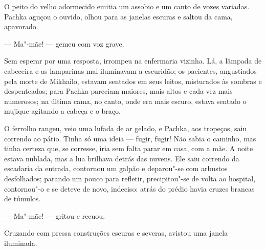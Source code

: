 O peito do velho adormecido emitia um assobio e um canto de vozes
variadas. Pachka aguçou o ouvido, olhou para as janelas escuras e saltou
da cama, apavorado.

--- Ma"-mãe! --- gemeu com voz grave.

Sem esperar por uma resposta, irrompeu na enfermaria vizinha. Lá, a
lâmpada de cabeceira e as lamparinas mal iluminavam a escuridão; os
pacientes, angustiados pela morte de Mikhailo, estavam sentados em seus
leitos, misturados às sombras e despenteados; para Pachka pareciam
maiores, mais altos e cada vez mais numerosos; na última cama, no canto,
onde era mais escuro, estava sentado o mujique agitando a cabeça e o
braço.


O ferrolho rangeu, veio uma lufada de ar gelado, e Pachka, aos tropeços,
saiu correndo ao pátio. Tinha só uma ideia --- fugir, fugir! Não sabia o
caminho, mas tinha certeza que, se corresse, iria sem falta parar em
casa, com a mãe. A noite estava nublada, mas a lua brilhava detrás das
nuvens. Ele saiu correndo da escadaria da entrada, contornou um galpão e
deparou"-se com arbustos desfolhados; parando um pouco para refletir,
precipitou"-se de volta ao hospital, contornou"-o e se deteve de novo,
indeciso: atrás do prédio havia cruzes brancas de túmulos.

--- Ma"-mãe! --- gritou e recuou.

Cruzando com pressa construções escuras e severas, avistou uma janela
iluminada.


